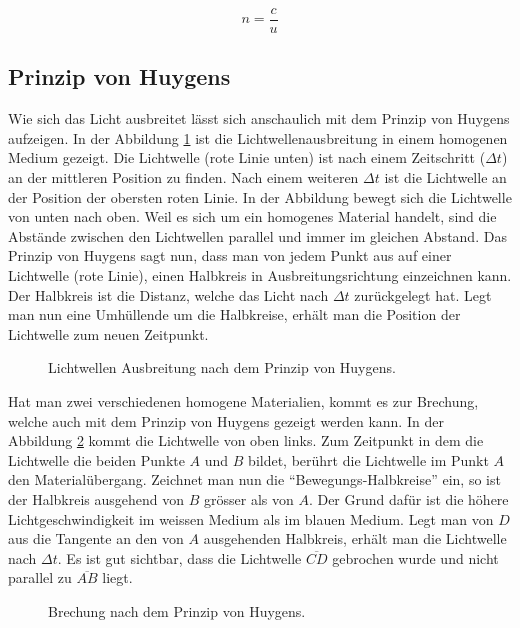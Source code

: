 \begin{refsection}
\begin{equation}
  n = \frac{c}{u}
\end{equation}


\subsection{Prinzip von Huygens}
Wie sich das Licht ausbreitet lässt sich anschaulich mit dem Prinzip
von Huygens aufzeigen.  In der Abbildung \ref{fig:huygens1} ist die
Lichtwellenausbreitung in einem homogenen Medium gezeigt.  Die
Lichtwelle (rote Linie unten) ist nach einem Zeitschritt
(\(\Delta t\)) an der mittleren Position zu finden.  Nach einem
weiteren \(\Delta t\) ist die Lichtwelle an der Position der obersten
roten Linie.  In der Abbildung bewegt sich die Lichtwelle von unten
nach oben.  Weil es sich um ein homogenes Material handelt, sind die
Abstände zwischen den Lichtwellen parallel und immer im gleichen
Abstand.  Das Prinzip von Huygens sagt nun, dass man von jedem Punkt
aus auf einer Lichtwelle (rote Linie), einen Halbkreis in
Ausbreitungsrichtung einzeichnen kann.  Der Halbkreis ist die Distanz,
welche das Licht nach \(\Delta t\) zurückgelegt hat.  Legt man nun
eine Umhüllende um die Halbkreise, erhält man die Position der
Lichtwelle zum neuen Zeitpunkt.

\begin{figure}
  \centering
  
  \caption{Lichtwellen Ausbreitung nach dem Prinzip von Huygens.}
  \label{fig:huygens1}
\end{figure}

Hat man zwei verschiedenen homogene Materialien, kommt es zur
Brechung, welche auch mit dem Prinzip von Huygens gezeigt werden kann.
In der Abbildung \ref{fig:huygens2} kommt die Lichtwelle von oben
links.  Zum Zeitpunkt in dem die Lichtwelle die beiden Punkte \(A\)
und \(B\) bildet, berührt die Lichtwelle im Punkt \(A\) den
Materialübergang.  Zeichnet man nun die ``Bewegungs-Halbkreise'' ein,
so ist der Halbkreis ausgehend von \(B\) grösser als von \(A\).  Der
Grund dafür ist die höhere Lichtgeschwindigkeit im weissen Medium als
im blauen Medium.  Legt man von \(D\) aus die Tangente an den von
\(A\) ausgehenden Halbkreis, erhält man die Lichtwelle nach
\(\Delta t\).  Es ist gut sichtbar, dass die Lichtwelle
\(\overline{CD}\) gebrochen wurde und nicht parallel zu
\(\overline{AB}\) liegt.

\begin{figure}
  \centering
  
  \caption{Brechung nach dem Prinzip von Huygens.}
  \label{fig:huygens2}
\end{figure}


\end{refsection}
